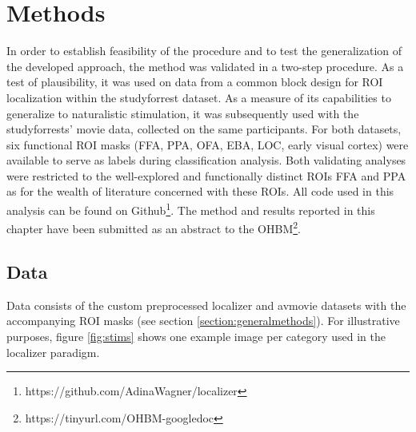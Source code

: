 \documentclass[a4paper, 12pt]{scrreprt}
\begin{document}
\section{Methods}
In order to establish feasibility of the procedure and to test the generalization of the developed approach, the method was validated in a two-step procedure. As a test of plausibility, it was used on data from a common block design for ROI localization within the studyforrest dataset. As a measure of its capabilities to generalize to naturalistic stimulation, it was subsequently used with the studyforrests' movie data, collected on the same participants. For both datasets, six functional ROI masks (FFA, PPA, OFA, EBA, LOC, early visual cortex) were available to serve as labels during classification analysis. Both validating analyses were restricted to the well-explored and functionally distinct ROIs FFA and PPA as for the wealth of literature concerned with these ROIs. \newline 
All code used in this analysis can be found on Github\footnote{https://github.com/AdinaWagner/localizer}. The method and results reported in this chapter have been submitted as an abstract to the OHBM\footnote{https://tinyurl.com/OHBM-googledoc}.

\subsection{Data}

Data consists of the custom preprocessed localizer and avmovie datasets with the accompanying ROI masks (see section \ref{section:generalmethods}). For illustrative purposes, figure \ref{fig:stims} shows one example image per category used in the localizer paradigm.
\end{document}
